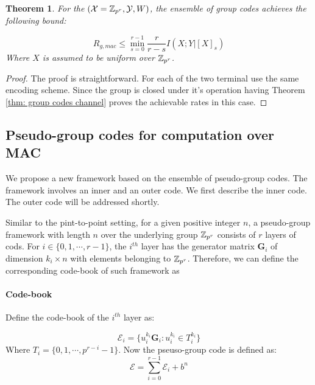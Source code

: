 \documentclass[conference]{IEEEtran}
\theoremstyle{plain}
\newtheorem{thm}{Theorem}
\theoremstyle{definition}
\theoremstyle{remark}
\begin{document}
\begin{thm}
For the $(\mathcal{X}=\mathbb{Z}_{p^r},\mathcal{Y},W)$, the ensemble of group codes achieves the following bound:

\begin{equation*}
R_{g,mac} \leq \min_{s=0}^{r-1} \frac{r}{r-s} I(X;Y|[X]_{s})
\end{equation*}
Where $X$ is assumed to be uniform over $\mathbb{Z}_{p^r}$.
\end{thm}


\begin{proof}
The proof is straightforward. For each of the two terminal use the same encoding scheme. Since the group is closed under it's operation having Theorem \ref{thm: group codes channel} proves the achievable rates in this case.
\end{proof}


\subsection{Pseudo-group codes for computation over MAC}
We propose a new framework based on the ensemble of pseudo-group codes. The framework involves an inner and an outer code. We first describe the inner code. The outer code will be addressed shortly. 

Similar to the pint-to-point setting, for a given positive integer $n$, a pseudo-group framework with length $n$ over the underlying group $\mathbb{Z}_{p^r}$ consists of $r$ layers of cods. For $i \in \{0,1,\cdots,r-1\}$, the $i^{th}$ layer has the generator matrix $\mathbf{G}_i$ of dimension $k_i\times n$ with elements belonging to $\mathbb{Z}_{p^r}$. Therefore, we can define the corresponding code-book of such framework as 

\paragraph*{Code-book}
Define the code-book of the $i^{th}$ layer as: 

\begin{equation}\label{eq: Pseudo_MAC layer i}
\mathcal{E}_i=\{ u_i^{k_i}\mathbf{G}_i: u_i^{k_i}\in T_i^{k_i}\}
\end{equation}
Where $T_i=\{0,1,\cdots, p^{r-i}-1\}$. Now the pseuso-group code is defined as:
\begin{equation}\label{eq: Pseudo_MAC codebook}
\mathcal{E}=\sum_{i=0}^{r-1} \mathcal{E}_i+b^n
\end{equation}
\end{document}
